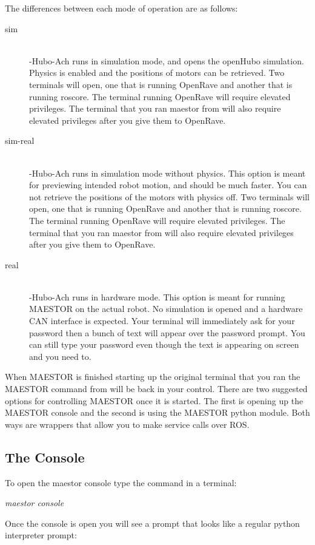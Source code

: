 \documentclass[12pt]{article}
\begin{document}
\noindent The differences between each mode of operation are as follows:
	\begin{description}
		\item[sim] \hfill \\
		-Hubo-Ach runs in simulation mode, and opens the openHubo simulation. Physics is enabled and the positions of motors can be retrieved. Two terminals will open, one that is running OpenRave and another that is running roscore. The terminal running OpenRave will require elevated privileges. The terminal that you ran maestor from will also require elevated privileges after you give them to OpenRave.
		\item[sim-real] \hfill \\
		-Hubo-Ach runs in simulation mode without physics. This option is meant for previewing intended robot motion, and should be much faster. You can not retrieve the positions of the motors with physics off. Two terminals will open, one that is running OpenRave and another that is running roscore. The terminal running OpenRave will require elevated privileges. The terminal that you ran maestor from will also require elevated privileges after you give them to OpenRave.
		\item[real] \hfill \\ 
		-Hubo-Ach runs in hardware mode. This option is meant for running MAESTOR on the actual robot. No simulation is opened and a hardware CAN interface is expected. Your terminal will immediately ask for your password then a bunch of text will appear over the password prompt. You can still type your password even though the text is appearing on screen and you need to. 
	\end{description}
	
\noindent When MAESTOR is finished starting up the original terminal that you ran the MAESTOR command from will be back in your control. There are two suggested options for controlling MAESTOR once it is started. The first is opening up the MAESTOR console and the second is using the MAESTOR python module. Both ways are wrappers that allow you to make service calls over ROS. 

\subsection{The Console}

To open the maestor console type the command in a terminal:
	\begin{center}
		\textit{maestor console}
	\end{center}
Once the console is open you will see a prompt that looks like a regular python interpreter prompt:
\end{document}
